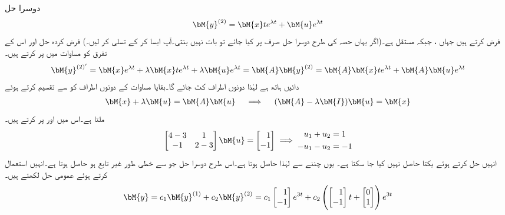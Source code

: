 دوسرا حل
\begin{align*}
\bM{y}^{(2)}=\bM{x}te^{\lambda t}+\bM{u}e^{\lambda t}
\end{align*}
 فرض کرتے ہیں جہاں ،  جبکہ  مستقل  ہے۔(اگر یہاں حصہ  کی طرح دوسرا حل صرف  پر کیا جائے تو بات نہیں بنتی۔آپ ایسا کر کے تسلی کر لیں۔) فرض کردہ حل اور اس کے تفرق کو مساوات  میں پر کرتے ہیں۔ 
\begin{align*}
\bM{y}^{(2)'}=\bM{x}e^{\lambda t}+\lambda \bM{x}te^{\lambda t}+\lambda \bM{u}e^{\lambda t}=\bM{A}\bM{y}^{(2)}=\bM{A}\bM{x}te^{\lambda t}+\bM{A}\bM{u}e^{\lambda t}
\end{align*}
دائیں ہاتھ  ہے لہٰذا دونوں اطراف  کٹ جائے گا۔بقایا مساوات کے دونوں اطراف کو  سے تقسیم کرتے ہوئے
\begin{align*}
\bM{x}+\lambda\bM{u}=\bM{A}\bM{u} \quad \implies \quad (\bM{A}-\lambda \bM{I})\bM{u}=\bM{x}
\end{align*}
ملتا ہے۔اس میں  اور  پر کرتے ہیں۔
\begin{gather*}
\begin{aligned}
\begin{bmatrix} 4-3&1 \\ -1&2-3 \end{bmatrix}\bM{u}=\begin{bmatrix*}[r] 1\\ -1  \end{bmatrix*}
\end{aligned}\implies 
\begin{aligned}
u_1+u_2&=1\\
-u_1-u_2&=-1
\end{aligned}
\end{gather*}
انہیں حل کرتے ہوئے یکتا  حاصل نہیں کیا جا سکتا ہے۔ یوں  چننے سے  لہٰذا  حاصل ہوتا ہے۔اس طرح دوسرا حل جو  سے خطی طور غیر تابع ہو حاصل ہوتا ہے۔انہیں استعمال کرتے ہوئے عمومی حل لکھتے ہیں۔
\begin{align}
\bM{y}=c_1\bM{y}^{(1)}+c_2\bM{y}^{(2)}=c_1\begin{bmatrix*}[r] 1\\-1 \end{bmatrix*}e^{3 t}+c_2\left(\begin{bmatrix*}[r]1\\-1  \end{bmatrix*}t+\begin{bmatrix} 0\\1\end{bmatrix}\right)e^{3t}
\end{align}
